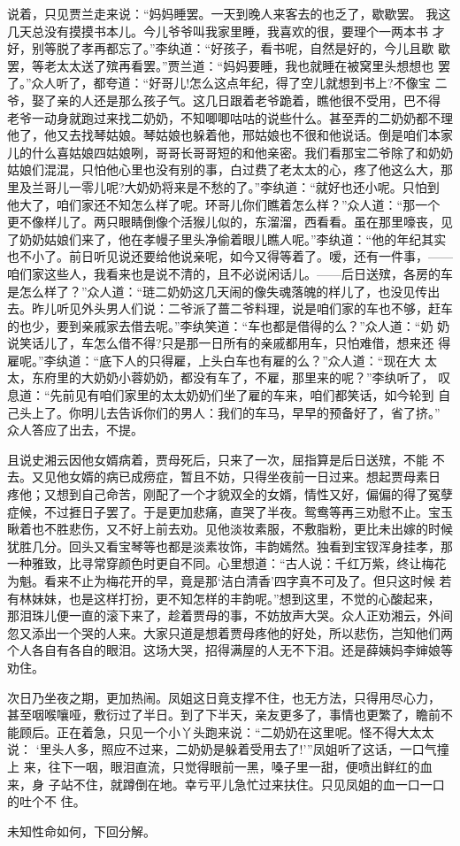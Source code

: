 说着，只见贾兰走来说：“妈妈睡罢。一天到晚人来客去的也乏了，歇歇罢。
我这几天总没有摸摸书本儿。今儿爷爷叫我家里睡，我喜欢的很，要理个一两本书
才好，别等脱了孝再都忘了。”李纨道：“好孩子，看书呢，自然是好的，今儿且歇
歇罢，等老太太送了殡再看罢。”贾兰道：“妈妈要睡，我也就睡在被窝里头想想也
罢了。”众人听了，都夸道：“好哥儿!怎么这点年纪，得了空儿就想到书上?不像宝
二爷，娶了亲的人还是那么孩子气。这几日跟着老爷跪着，瞧他很不受用，巴不得
老爷一动身就跑过来找二奶奶，不知唧唧咕咕的说些什么。甚至弄的二奶奶都不理
他了，他又去找琴姑娘。琴姑娘也躲着他，邢姑娘也不很和他说话。倒是咱们本家
儿的什么喜姑娘四姑娘咧，哥哥长哥哥短的和他亲密。我们看那宝二爷除了和奶奶
姑娘们混混，只怕他心里也没有别的事，白过费了老太太的心，疼了他这么大，那
里及兰哥儿一零儿呢?大奶奶将来是不愁的了。”李纨道：“就好也还小呢。只怕到
他大了，咱们家还不知怎么样了呢。环哥儿你们瞧着怎么样？”众人道：“那一个
更不像样儿了。两只眼睛倒像个活猴儿似的，东溜溜，西看看。虽在那里嚎丧，见
了奶奶姑娘们来了，他在孝幔子里头净偷着眼儿瞧人呢。”李纨道：“他的年纪其实
也不小了。前日听见说还要给他说亲呢，如今又得等着了。嗳，还有一件事，——
咱们家这些人，我看来也是说不清的，且不必说闲话儿。——后日送殡，各房的车
是怎么样了？”众人道：“琏二奶奶这几天闹的像失魂落魄的样儿了，也没见传出
去。昨儿听见外头男人们说：二爷派了蔷二爷料理，说是咱们家的车也不够，赶车
的也少，要到亲戚家去借去呢。”李纨笑道：“车也都是借得的么？”众人道：“奶
奶说笑话儿了，车怎么借不得?只是那一日所有的亲戚都用车，只怕难借，想来还
得雇呢。”李纨道：“底下人的只得雇，上头白车也有雇的么？”众人道：“现在大
太太，东府里的大奶奶小蓉奶奶，都没有车了，不雇，那里来的呢？”李纨听了，
叹息道：“先前见有咱们家里的太太奶奶们坐了雇的车来，咱们都笑话，如今轮到
自己头上了。你明儿去告诉你们的男人：我们的车马，早早的预备好了，省了挤。”
众人答应了出去，不提。

且说史湘云因他女婿病着，贾母死后，只来了一次，屈指算是后日送殡，不能
不去。又见他女婿的病已成痨症，暂且不妨，只得坐夜前一日过来。想起贾母素日
疼他；又想到自己命苦，刚配了一个才貌双全的女婿，情性又好，偏偏的得了冤孽
症候，不过捱日子罢了。于是更加悲痛，直哭了半夜。鸳鸯等再三劝慰不止。宝玉
瞅着也不胜悲伤，又不好上前去劝。见他淡妆素服，不敷脂粉，更比未出嫁的时候
犹胜几分。回头又看宝琴等也都是淡素妆饰，丰韵嫣然。独看到宝钗浑身挂孝，那
一种雅致，比寻常穿颜色时更自不同。心里想道：“古人说：千红万紫，终让梅花
为魁。看来不止为梅花开的早，竟是那‘洁白清香’四字真不可及了。但只这时候
若有林妹妹，也是这样打扮，更不知怎样的丰韵呢。”想到这里，不觉的心酸起来，
那泪珠儿便一直的滚下来了，趁着贾母的事，不妨放声大哭。众人正劝湘云，外间
忽又添出一个哭的人来。大家只道是想着贾母疼他的好处，所以悲伤，岂知他们两
个人各自有各自的眼泪。这场大哭，招得满屋的人无不下泪。还是薛姨妈李婶娘等
劝住。

次日乃坐夜之期，更加热闹。凤姐这日竟支撑不住，也无方法，只得用尽心力，
甚至咽喉嚷哑，敷衍过了半日。到了下半天，亲友更多了，事情也更繁了，瞻前不
能顾后。正在着急，只见一个小丫头跑来说：“二奶奶在这里呢。怪不得大太太说：
‘里头人多，照应不过来，二奶奶是躲着受用去了!’”凤姐听了这话，一口气撞上
来，往下一咽，眼泪直流，只觉得眼前一黑，嗓子里一甜，便喷出鲜红的血来，身
子站不住，就蹲倒在地。幸亏平儿急忙过来扶住。只见凤姐的血一口一口的吐个不
住。

未知性命如何，下回分解。